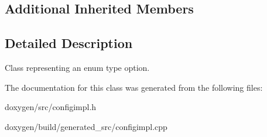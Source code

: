 \subsection*{Additional Inherited Members}


\subsection{Detailed Description}
Class representing an enum type option. 

The documentation for this class was generated from the following files\+:\begin{DoxyCompactItemize}
\item 
doxygen/src/configimpl.\+h\item 
doxygen/build/generated\+\_\+src/configimpl.\+cpp\end{DoxyCompactItemize}
